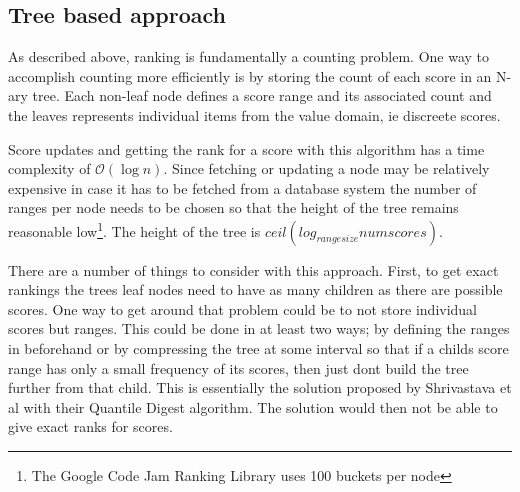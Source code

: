 \subsection{Tree based approach}

As described above, ranking is fundamentally a counting problem. One way to accomplish counting more efficiently is by storing the count of each score in an N-ary tree. Each non-leaf node defines a score range and its associated count and the leaves represents individual items from the value domain, ie discreete scores.


Score updates and getting the rank for a score with this algorithm has a time complexity of $\mathcal{O}(\log{} n)$. Since fetching or updating a node may be relatively expensive in case it has to be fetched from a database system the number of ranges per node needs to be chosen so that the height of the tree remains reasonable low\footnote{The Google Code Jam Ranking Library uses 100 buckets per node}. The height of the tree is $ceil(log_{rangesize}numscores)$.

There are a number of things to consider with this approach. First, to get exact rankings the trees leaf nodes need to have as many children as there are possible scores. One way to get around that problem could be to not store individual scores but ranges. This could be done in at least two ways; by defining the ranges in beforehand or by compressing the tree at some interval so that if a childs score range has only a small frequency of its scores, then just dont build the tree further from that child. This is essentially the solution proposed by Shrivastava et al\cite{quantile_digest} with their Quantile Digest algorithm. The solution would then not be able to give exact ranks for scores.


